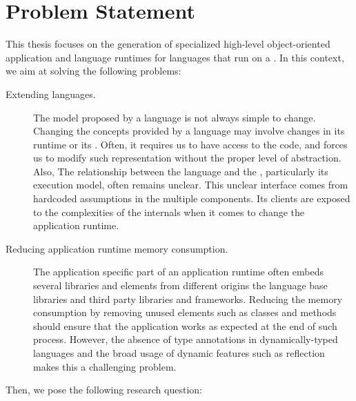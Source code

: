 \section{Problem Statement}

This thesis focuses on the generation of specialized high-level object-oriented application and language runtimes for languages that run on a \VM. In this context, we aim at solving the following problems:

\begin{description}

\item[Extending languages.] The model proposed by a language is not always simple to change. Changing the concepts provided by a language may involve changes in its runtime or its \VM. Often, it requires us to have access to the \VM code, and forces us to modify such representation without the proper level of abstraction. Also, The relationship between the language and the \VM, particularly its execution model, often remains unclear. This unclear interface comes from hardcoded assumptions in the multiple \VM components. Its clients are exposed to the complexities of the \VM internals when it comes to change the application runtime.

\item[Reducing application runtime memory consumption.] The application specific part of an application runtime often embeds several libraries and elements from different origins \eg the language base libraries and third party libraries and frameworks. Reducing the memory consumption by removing unused elements such as classes and methods should ensure that the application works as expected at the end of such process. However, the absence of type annotations in dynamically-typed languages and the broad usage of dynamic features such as reflection makes this a challenging problem.



\end{description}

\noindent Then, we pose the following research question:

